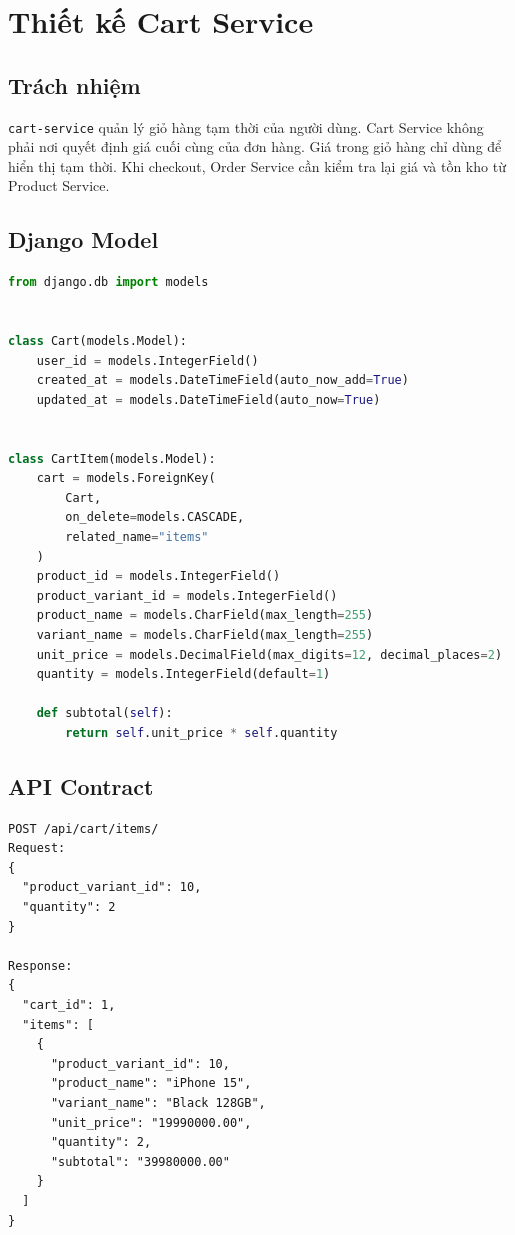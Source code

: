 \section{Thiết kế Cart Service}

\subsection{Trách nhiệm}

\texttt{cart-service} quản lý giỏ hàng tạm thời của người dùng. Cart Service không phải nơi quyết định giá cuối cùng của đơn hàng. Giá trong giỏ hàng chỉ dùng để hiển thị tạm thời. Khi checkout, Order Service cần kiểm tra lại giá và tồn kho từ Product Service.

\subsection{Django Model}

\begin{lstlisting}[style=code,language=Python]
from django.db import models


class Cart(models.Model):
    user_id = models.IntegerField()
    created_at = models.DateTimeField(auto_now_add=True)
    updated_at = models.DateTimeField(auto_now=True)


class CartItem(models.Model):
    cart = models.ForeignKey(
        Cart,
        on_delete=models.CASCADE,
        related_name="items"
    )
    product_id = models.IntegerField()
    product_variant_id = models.IntegerField()
    product_name = models.CharField(max_length=255)
    variant_name = models.CharField(max_length=255)
    unit_price = models.DecimalField(max_digits=12, decimal_places=2)
    quantity = models.IntegerField(default=1)

    def subtotal(self):
        return self.unit_price * self.quantity
\end{lstlisting}

\subsection{API Contract}

\begin{lstlisting}[style=code]
POST /api/cart/items/
Request:
{
  "product_variant_id": 10,
  "quantity": 2
}

Response:
{
  "cart_id": 1,
  "items": [
    {
      "product_variant_id": 10,
      "product_name": "iPhone 15",
      "variant_name": "Black 128GB",
      "unit_price": "19990000.00",
      "quantity": 2,
      "subtotal": "39980000.00"
    }
  ]
}
\end{lstlisting}

